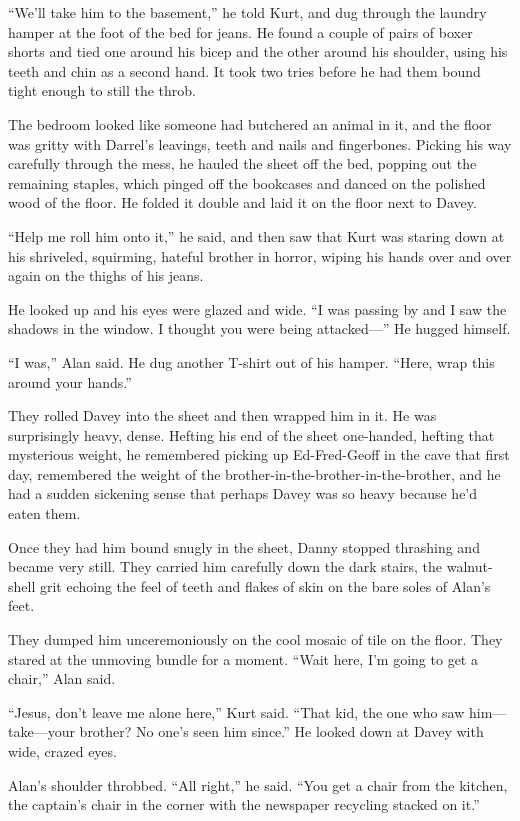 ``We'll take him to the basement,'' he told Kurt, and dug through the
laundry hamper at the foot of the bed for jeans.  He found a couple of
pairs of boxer shorts and tied one around his bicep and the other
around his shoulder, using his teeth and chin as a second hand.  It
took two tries before he had them bound tight enough to still the
throb.

The bedroom looked like someone had butchered an animal in it, and the
floor was gritty with Darrel's leavings, teeth and nails and
fingerbones.  Picking his way carefully through the mess, he hauled
the sheet off the bed, popping out the remaining staples, which pinged
off the bookcases and danced on the polished wood of the floor.  He
folded it double and laid it on the floor next to Davey.

``Help me roll him onto it,'' he said, and then saw that Kurt was
staring down at his shriveled, squirming, hateful brother in horror,
wiping his hands over and over again on the thighs of his jeans.

He looked up and his eyes were glazed and wide.  ``I was passing by
and I saw the shadows in the window.  I thought you were being
attacked---'' He hugged himself.

``I was,'' Alan said.  He dug another T-shirt out of his hamper. 
``Here, wrap this around your hands.''

They rolled Davey into the sheet and then wrapped him in it.  He was
surprisingly heavy, dense.  Hefting his end of the sheet one-handed,
hefting that mysterious weight, he remembered picking up Ed-Fred-Geoff
in the cave that first day, remembered the weight of the
brother-in-the-brother-in-the-brother, and he had a sudden sickening
sense that perhaps Davey was so heavy because he'd eaten them.

Once they had him bound snugly in the sheet, Danny stopped thrashing
and became very still.  They carried him carefully down the dark
stairs, the walnut-shell grit echoing the feel of teeth and flakes of
skin on the bare soles of Alan's feet.

They dumped him unceremoniously on the cool mosaic of tile on the
floor.  They stared at the unmoving bundle for a moment.  ``Wait here,
I'm going to get a chair,'' Alan said.

``Jesus, don't leave me alone here,'' Kurt said.  ``That kid, the one
who saw him---take---your brother?  No one's seen him since.'' He
looked down at Davey with wide, crazed eyes.

Alan's shoulder throbbed.  ``All right,'' he said.  ``You get a chair
from the kitchen, the captain's chair in the corner with the newspaper
recycling stacked on it.''

